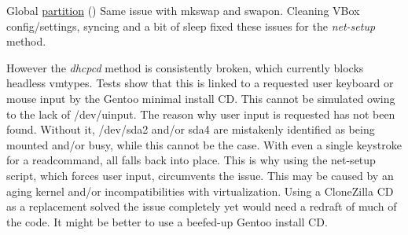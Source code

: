 
\begin{DoxyRefList}
\item[Global \mbox{\hyperlink{group__mk_file_system_gaa9952b2711fe0413d7a0bc6639c7f5a5}{partition}} ()]\label{bug__bug000001}%
%
Same issue with mkswap and swapon. Cleaning V\+Box config/settings, syncing and a bit of sleep fixed these issues for the {\itshape net-\/setup} method. 

However the {\itshape dhcpcd} method is consistently broken, which currently blocks headless vmtypes. Tests show that this is linked to a requested user keyboard or mouse input by the Gentoo minimal install CD. This cannot be simulated owing to the lack of /dev/uinput. The reason why user input is requested has not been found. Without it, /dev/sda2 and/or sda4 are mistakenly identified as being mounted and/or busy, while this cannot be the case. With even a single keystroke for a {\ttfamily read}command, all falls back into place. This is why using the net-\/setup script, which forces user input, circumvents the issue. This may be caused by an aging kernel and/or incompatibilities with virtualization. Using a Clone\+Zilla CD as a replacement solved the issue completely yet would need a redraft of much of the code. It might be better to use a beefed-\/up Gentoo install CD. 
\end{DoxyRefList}